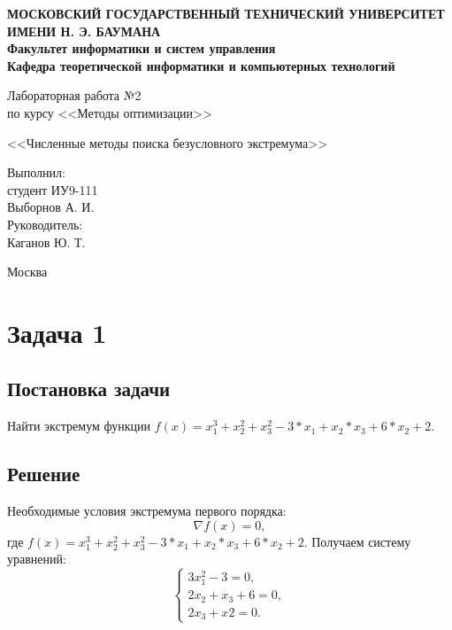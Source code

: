 \documentclass[12pt,a4paper,oneside]{extarticle}
\begin{document}
\pgfplotsset{compat=1.8}

\thispagestyle{empty}
\newpage
{
\centering


\textbf{
МОСКОВСКИЙ ГОСУДАРСТВЕННЫЙ ТЕХНИЧЕСКИЙ УНИВЕРСИТЕТ ИМЕНИ Н. Э. БАУМАНА \\
Факультет информатики и систем управления \\
Кафедра теоретической информатики и компьютерных технологий}
\bigskip
\bigskip
\bigskip
\bigskip
\bigskip
\bigskip
\bigskip

\vfill


Лабораторная работа №2 \\
по курсу <<Методы оптимизации>>

\bigskip

{\large <<Численные методы поиска безусловного экстремума>>}
\bigskip

\vfill



\hfill\parbox{4cm} {
Выполнил:\\
студент ИУ9-111 \hfill \\
Выборнов А. И.\hfill \medskip\\
Руководитель:\\
Каганов Ю. Т.\hfill
}


\vspace{\fill}

Москва \number\year
\clearpage
}



\clearpage

\section{Задача 1}
    \subsection{Постановка задачи}
        Найти экстремум функции $f(x) = x_1^3 + x_2^2 + x_3^2 - 3*x_1 + x_2*x_3 + 6*x_2 + 2$. 

    \subsection{Решение}
        Необходимые условия экстремума первого порядка:
        $$\nabla f(x) = 0,$$ где $f(x) = x_1^3 + x_2^2 + x_3^2 - 3*x_1 + x_2*x_3 + 6*x_2 + 2$. Получаем систему уравнений:
        \begin{equation}
            \begin{cases}
               3x_1^2-3 = 0, \\
               2x_2 + x_3 + 6 = 0, \\
               2x_3 + x2 = 0.
            \end{cases}
        \end{equation}
\end{document}
